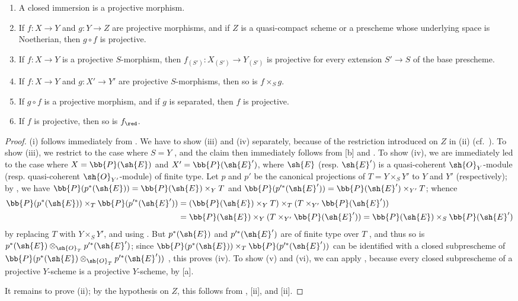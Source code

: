 \begin{proposition}[5.5.5]
\label{II.5.5.5}
\medskip\noindent
\begin{enumerate}
  \item[{\rm(i)}] A closed immersion is a projective morphism.
  \item[{\rm(ii)}] If $f:X\to Y$ and $g:Y\to Z$ are projective morphisms, and if $Z$ is a quasi-compact scheme or a prescheme whose underlying space is Noetherian, then $g\circ f$ is projective.
  \item[{\rm(iii)}] If $f:X\to Y$ is a projective $S$-morphism, then $f_{(S')}:X_{(S')}\to Y_{(S')}$ is projective for every extension $S'\to S$ of the base prescheme.
  \item[{\rm(iv)}] If $f:X\to Y$ and $g:X'\to Y'$ are projective $S$-morphisms, then so is $f\times_S g$.
  \item[{\rm(v)}] If $g\circ f$ is a projective morphism, and if $g$ is separated, then $f$ is projective.
  \item[{\rm(vi)}] If $f$ is projective, then so is $f_\red$.
\end{enumerate}
\end{proposition}

\begin{proof}
(i) follows immediately from .
We have to show (iii) and (iv) separately, because of the restriction introduced on $Z$ in (ii) (cf.~).
To show (iii), we restrict to the case where $S=Y$ , and the claim then immediately follows from [b] and .
To show (iv), we are immediately led to the case where $X=\bb{P}(\sh{E})$ and $X'=\bb{P}(\sh{E}')$, where $\sh{E}$ (resp. $\sh{E}'$) is a quasi-coherent $\sh{O}_Y$-module (resp. quasi-coherent $\sh{O}_{Y'}$-module) of finite type.
Let $p$ and $p'$ be the canonical projections of $T=Y\times_S Y'$ to $Y$ and $Y'$ (respectively); by , we have $\bb{P}(p^*(\sh{E})) = \bb{P}(\sh{E})\times_Y T$ and $\bb{P}(p^{\prime *}(\sh{E}'))=\bb{P}(\sh{E}')\times_{Y'}T$; whence
\begin{align*}
  \bb{P}(p^*(\sh{E}))\times_T\bb{P}(p^{\prime *}(\sh{E}'))&=(\bb{P}(\sh{E})\times_Y T)\times_T(T\times_{Y'}\bb{P}(\sh{E}'))\\
                                              &=\bb{P}(\sh{E})\times_Y(T\times_{Y'}\bb{P}(\sh{E}'))=\bb{P}(\sh{E})\times_S\bb{P}(\sh{E}')
\end{align*}
by replacing $T$ with $Y\times_S Y'$, and using .
But $p^*(\sh{E})$ and $p^{\prime *}(\sh{E}')$ are of finite type over $T$ , and thus so is $p^*(\sh{E})\otimes_{\sh{O}_T}p^{\prime *}(\sh{E}')$;
since $\bb{P}(p^*(\sh{E}))\times_T\bb{P}(p^{\prime *}(\sh{E}'))$ can be identified with a closed subprescheme of $\bb{P}(p^*(\sh{E})\otimes_{\sh{O}_T}p^{\prime *}(\sh{E}'))$ , this proves (iv).
To show (v) and (vi), we can apply , because every closed subprescheme of a projective $Y$-scheme is a projective $Y$-scheme, by [a].

It remains to prove (ii); by the hypothesis on $Z$, this follows from , [ii], and [ii].
\end{proof}

